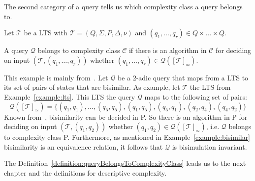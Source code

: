 The second category of a query tells us which complexity class a query belongs to.

\begin{definition}
    \label{definition:queryBelongsToComplexityClass}
    Let $\mathcal{T}$ be a LTS with $\mathcal{T} = (Q, \Sigma, P, \Delta, \nu)$ and $(q_1, \dots, q_{r}) \in Q \times
    \dots \times Q$.

    A query $\mathcal{Q}$ belongs to complexity class $\mathcal{C}$ if there is an algorithm in $\mathcal{C}$ for
    deciding on input $(\mathcal{T}, (q_1, \dots, q_{r}))$ whether $(q_1, \dots, q_{r}) \in \mathcal{Q}
    ([\mathcal{T}]_\simeq)$.
\end{definition}

\begin{example}
    This example is mainly from~\cite{lange2014capturing}. Let $\mathcal{Q}$ be a $2$-adic query that maps from a
    LTS to its set of pairs of states that are bisimilar. As example, let $\mathcal{T}$ the LTS from
    Example~\ref{example:lts}. This LTS the query $\mathcal{Q}$ maps to the following set of pairs:
    \[\mathcal{Q}([\mathcal{T}]_\simeq) = \{(q_1, q_1), \dots, (q_5, q_5), (q_1, q_5), (q_5, q_1), (q_2, q_4), (q_4,
    q_2)\}\]
    Known from~\cite{lange2014capturing}, bisimilarity can be decided in P. So there is an algorithm in P for deciding on
    input $(\mathcal{T}, (q_1, q_2))$ whether $(q_1, q_2) \in \mathcal{Q}([\mathcal{T}]_\simeq)$, i.e. $\mathcal{Q}$
    belongs to complexity class P. Furthermore, as mentioned in Example~\ref{example:bisimilar} bisimilarity is an
    equivalence relation, it follows that $\mathcal{Q}$ is bisimulation invariant.
\end{example}

The Definition~\ref{definition:queryBelongsToComplexityClass} leads us to the next chapter and the definitions for
descriptive complexity.